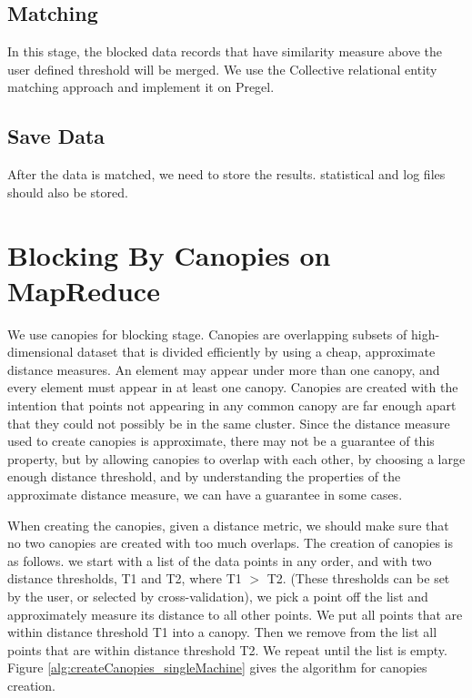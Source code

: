 \subsection{Matching}
In this stage, the blocked data records that have similarity measure above the user defined threshold will be merged. We use the Collective relational entity matching approach and implement it on Pregel.
\subsection{Save Data}
After the data is matched, we need to store the results. statistical and log files should also be stored.

\section{Blocking By Canopies on MapReduce}
We use canopies for blocking stage. Canopies\cite{MNUn00} are overlapping subsets of high-dimensional dataset that is divided efficiently by using a cheap, approximate distance measures. An element may appear under more than one canopy, and every element must appear in at least one canopy. Canopies are created with the intention that points not appearing in any common canopy are far enough apart that they could not possibly be in the same cluster. Since the distance measure used to create canopies is approximate, there may not be a guarantee of this property, but by allowing canopies to overlap with each other, by choosing a large enough distance threshold, and by understanding the properties of the approximate distance measure, we can have a guarantee in some cases. 

When creating the canopies, given a distance metric, we should make sure that no two canopies are created with too much overlaps. The creation of canopies is as follows. we start with a list of the data points in any order, and with two distance thresholds, T1 and T2, where T1 $>$ T2. (These thresholds can be set by the user, or selected by cross-validation), we pick a point off the list and approximately measure its distance to all other points. We put all points that are within distance threshold T1 into a canopy. Then we remove from the list all points that are within distance threshold T2. We repeat until the list is empty\cite{MNUn00}. Figure \ref{alg:createCanopies_singleMachine} gives the algorithm for canopies creation.

